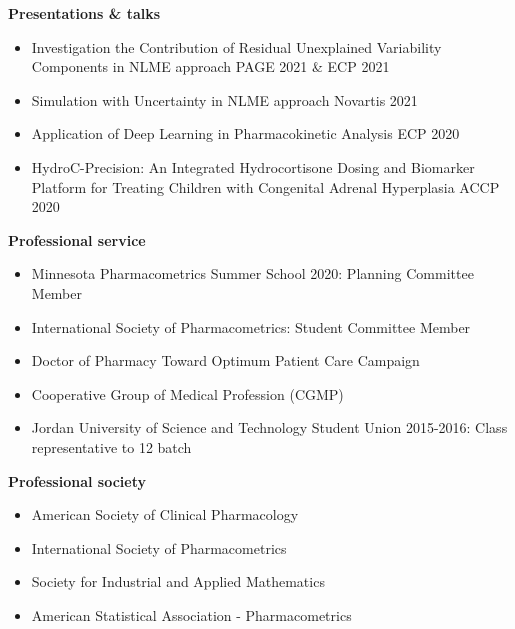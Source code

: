 \documentclass[a4paper,11pt]{article}
\begin{document}
{\centering\textbf{Presentations \& talks}}
\begin{itemize}
    \item Investigation the Contribution of Residual Unexplained Variability Components in NLME approach \hfill  PAGE 2021 \& ECP 2021
    \item Simulation with Uncertainty in NLME approach \hfill Novartis 2021 
    \item Application of Deep Learning in Pharmacokinetic Analysis \hfill ECP 2020 
    \item HydroC-Precision: An Integrated Hydrocortisone Dosing and Biomarker Platform for Treating Children with Congenital Adrenal Hyperplasia \hfill ACCP 2020
\end{itemize}
\textbf{Professional service}
\begin{itemize}
\item Minnesota Pharmacometrics Summer School 2020: Planning Committee Member 
\item International Society of Pharmacometrics: Student Committee Member 
\item Doctor of Pharmacy Toward Optimum Patient Care Campaign 
\item Cooperative Group of Medical Profession (CGMP) 
\item  Jordan University of Science and Technology Student Union 2015-2016: Class representative to 12 batch
\end{itemize}
\textbf{Professional society}
\begin{itemize}
    \item American Society of Clinical Pharmacology
    \item International Society of Pharmacometrics 
    \item Society for Industrial and Applied Mathematics 
    \item American Statistical Association - Pharmacometrics 
\end{itemize} 
\end{document}
